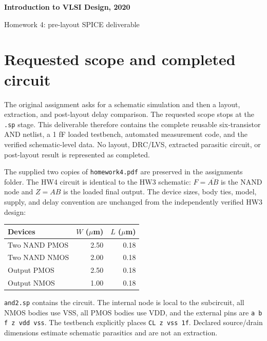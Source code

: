 \documentclass[11pt]{article}
\begin{document}
\begin{center}{\Large\bfseries Introduction to VLSI Design, 2020}\par{\large Homework 4: pre-layout SPICE deliverable}\end{center}
\section*{Requested scope and completed circuit}
The original assignment asks for a schematic simulation and then a layout, extraction, and post-layout delay comparison. The requested scope stops at the \texttt{.sp} stage. This deliverable therefore contains the complete reusable six-transistor AND netlist, a 1 fF loaded testbench, automated measurement code, and the verified schematic-level data. No layout, DRC/LVS, extracted parasitic circuit, or post-layout result is represented as completed.

The supplied two copies of \texttt{homework4.pdf} are preserved in the assignments folder. The HW4 circuit is identical to the HW3 schematic: $F=\overline{AB}$ is the NAND node and $Z=AB$ is the loaded final output. The device sizes, body ties, model, supply, and delay convention are unchanged from the independently verified HW3 design:
\begin{center}\begin{tabular}{lrr}\toprule Devices&$W$ ($\mu$m)&$L$ ($\mu$m)\\\midrule
Two NAND PMOS&2.50&0.18\\Two NAND NMOS&2.00&0.18\\Output PMOS&2.50&0.18\\Output NMOS&1.00&0.18\\\bottomrule\end{tabular}\end{center}
\texttt{and2.sp} contains the circuit. The internal node is local to the subcircuit, all NMOS bodies use VSS, all PMOS bodies use VDD, and the external pins are \texttt{a b f z vdd vss}. The testbench explicitly places \texttt{CL z vss 1f}. Declared source/drain dimensions estimate schematic parasitics and are not an extraction.
\end{document}
